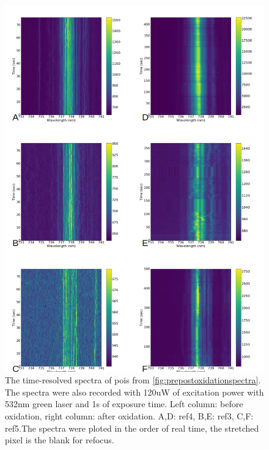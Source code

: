 \begin{figure}[h]
	\centering
	\includegraphics[width=1\linewidth]{Figures/pic/prepostoxidationtimeresolvespectra}
	\caption{The time-resolved spectra of pois from \ref{fig:prepostoxidationspectra}. The spectra were also recorded with 120uW of excitation power with 532nm green laser and 1s of exposure time. Left column: before oxidation, right column: after oxidation. A,D: ref4, B,E: ref3, C,F: ref5.The spectra were ploted in the order of real time, the stretched pixel is the blank for refocus.}
	\label{fig:prepostoxidationtimeresolvespectra}
\end{figure}


